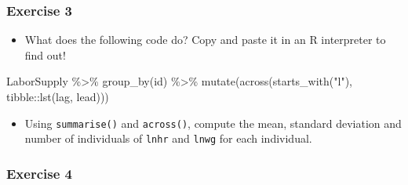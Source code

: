 \documentclass[
]{article}
\newenvironment{Shaded}{\begin{snugshade}}{\end{snugshade}}
\newcommand{\FunctionTok}[1]{\textcolor[rgb]{0.00,0.00,0.00}{#1}}
\newcommand{\NormalTok}[1]{#1}
\newcommand{\SpecialCharTok}[1]{\textcolor[rgb]{0.00,0.00,0.00}{#1}}
\newcommand{\StringTok}[1]{\textcolor[rgb]{0.31,0.60,0.02}{#1}}
\providecommand{\tightlist}{%
  \setlength{\itemsep}{0pt}\setlength{\parskip}{0pt}}
\begin{document}
\hypertarget{exercise-3-1}{%
\subsubsection*{Exercise 3}\label{exercise-3-1}}

\begin{itemize}
\tightlist
\item
  What does the following code do? Copy and paste it in an R interpreter to find out!
\end{itemize}

\begin{Shaded}
\begin{Highlighting}[]
\NormalTok{LaborSupply }\SpecialCharTok{\%\textgreater{}\%}
  \FunctionTok{group\_by}\NormalTok{(id) }\SpecialCharTok{\%\textgreater{}\%}
  \FunctionTok{mutate}\NormalTok{(}\FunctionTok{across}\NormalTok{(}\FunctionTok{starts\_with}\NormalTok{(}\StringTok{"l"}\NormalTok{), tibble}\SpecialCharTok{::}\FunctionTok{lst}\NormalTok{(lag, lead)))}
\end{Highlighting}
\end{Shaded}

\begin{itemize}
\tightlist
\item
  Using \texttt{summarise()} and \texttt{across()}, compute the mean, standard deviation and number of individuals of \texttt{lnhr} and \texttt{lnwg} for each individual.
\end{itemize}

\hypertarget{exercise-4-1}{%
\subsubsection*{Exercise 4}\label{exercise-4-1}}
\end{document}
